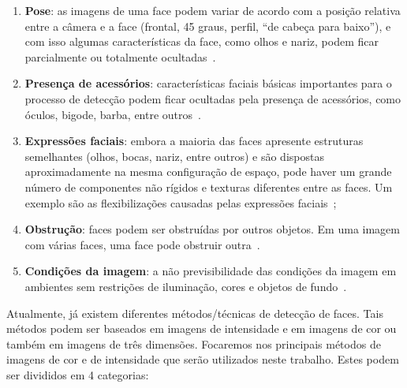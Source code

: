 	\begin{enumerate}
		\item \textbf{Pose}: as imagens de uma face podem variar de acordo com a posição relativa entre a câmera e a face (frontal, 45 graus, perfil, ``de cabeça para baixo''), e com isso algumas características da face, como olhos e nariz, podem ficar parcialmente ou totalmente ocultadas~\cite{yang}.
		\item \textbf{Presença de acessórios}: características faciais básicas importantes para o processo de detecção podem ficar ocultadas pela presença de acessórios, como óculos, bigode, barba, entre outros~\cite{oliveira, yang}. 
		\item \textbf{Expressões faciais}: embora a maioria das faces apresente estruturas semelhantes (olhos, bocas, nariz, entre outros) e são dispostas aproximadamente na mesma configuração de espaço, pode haver um grande número de componentes não rígidos e texturas diferentes entre as faces. Um exemplo são as flexibilizações causadas pelas expressões faciais~\cite{oliveira, yang};
		\item \textbf{Obstrução}: faces podem ser obstruídas por outros objetos. Em uma imagem com várias faces, uma face pode obstruir outra~\cite{yang}.
		\item \textbf{Condições da imagem}: a não previsibilidade das condições da imagem em ambientes sem restrições de iluminação, cores e objetos de fundo~\cite{oliveira, yang}.
	\end{enumerate}

Atualmente, já existem diferentes métodos/técnicas de detecção de faces. Tais métodos podem ser baseados em imagens de intensidade e em imagens de cor ou também em imagens de três dimensões. Focaremos nos principais métodos de imagens de cor e de intensidade que serão utilizados neste trabalho. Estes podem ser divididos em 4 categorias:

